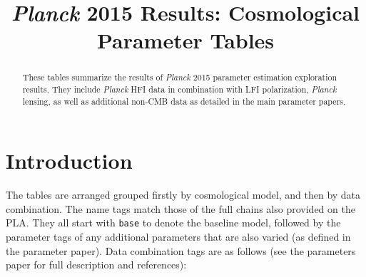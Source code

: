 \title{\textit{Planck} 2015 Results: Cosmological Parameter Tables}


\maketitle
\begin{abstract}
These tables summarize the results of \textit{Planck} 2015 parameter estimation exploration results. They include \textit{Planck} HFI data in combination with LFI polarization, \textit{Planck} lensing, as well as additional non-CMB data as detailed in the main parameter papers.
\end{abstract}

\newpage
\section{Introduction}

The tables are arranged grouped firstly by cosmological model, and then by data combination. The name tags match those of the full chains also provided on the PLA. They all start with {\tt base} to denote the baseline model, followed by the parameter tags of any additional parameters that are also varied (as defined in the parameter paper). Data combination tags are as follows (see the parameters paper for full description and references):


